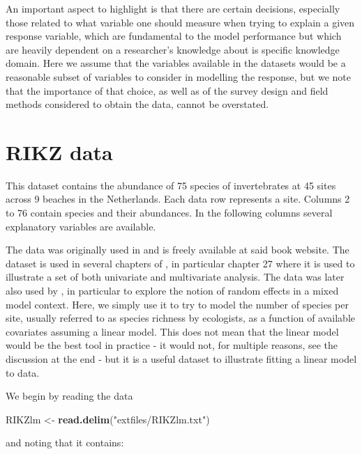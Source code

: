\documentclass[
]{book}
\newenvironment{Shaded}{\begin{snugshade}}{\end{snugshade}}
\newcommand{\FunctionTok}[1]{\textcolor[rgb]{0.13,0.29,0.53}{\textbf{#1}}}
\newcommand{\NormalTok}[1]{#1}
\newcommand{\OtherTok}[1]{\textcolor[rgb]{0.56,0.35,0.01}{#1}}
\newcommand{\StringTok}[1]{\textcolor[rgb]{0.31,0.60,0.02}{#1}}
\begin{document}
An important aspect to highlight is that there are certain decisions, especially those related to what variable one should measure when trying to explain a given response variable, which are fundamental to the model performance but which are heavily dependent on a researcher's knowledge about is specific knowledge domain. Here we assume that the variables available in the datasets would be a reasonable subset of variables to consider in modelling the response, but we note that the importance of that choice, as well as of the survey design and field methods considered to obtain the data, cannot be overstated.

\hypertarget{rikz-data}{%
\section{RIKZ data}\label{rikz-data}}

This dataset contains the abundance of 75 species of invertebrates at 45 sites across 9 beaches in the Netherlands. Each data row represents a site. Columns 2 to 76 contain species and their abundances. In the following columns several explanatory variables are available.

The data was originally used in \citet{Zuur2007} and is freely available at said book website. The dataset is used in several chapters of \citet{Zuur2007}, in particular chapter 27 \citet{Janssen2007} where it is used to illustrate a set of both univariate and multivariate analysis. The data was later also used by \citet{Zuur2009b}, in particular to explore the notion of random effects in a mixed model context. Here, we simply use it to try to model the number of species per site, usually referred to as species richness by ecologists, as a function of available covariates assuming a linear model. This does not mean that the linear model would be the best tool in practice - it would not, for multiple reasons, see the discussion at the end - but it is a useful dataset to illustrate fitting a linear model to data.

We begin by reading the data

\begin{Shaded}
\begin{Highlighting}[]
\NormalTok{RIKZlm }\OtherTok{\textless{}{-}} \FunctionTok{read.delim}\NormalTok{(}\StringTok{"extfiles/RIKZlm.txt"}\NormalTok{)}
\end{Highlighting}
\end{Shaded}

and noting that it contains:
\end{document}
